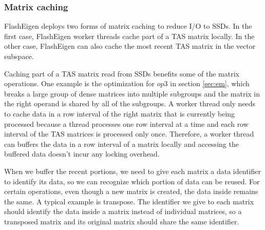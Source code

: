 

\subsubsection{Matrix caching}
FlashEigen deploys two forms of matrix caching to reduce I/O to SSDs.
In the first case, FlashEigen worker threads cache part of a TAS
matrix locally. In the other case, FlashEigen can also cache the most recent
TAS matrix in the vector subspace.

Caching part of a TAS matrix read from SSDs benefits some of
the matrix operations. One example is the optimization for $op3$ in section
\ref{sec:em}, which breaks a large group of dense matrices into multiple
subgroups and the matrix in the right operand is shared by all of the subgroups.
A worker thread only needs to cache data in a row interval of the right matrix
that is currently being processed because a thread processes one row interval
at a time and each row interval of the TAS matrices is processed only once.
Therefore, a worker thread can buffers the data in a row interval of a matrix
locally and accessing the buffered data doesn't incur any locking overhead.

When we buffer the recent portions, we need to give each matrix a data identifier
to identify its data, so we can recognize which portion of data can be reused.
For certain operations, even though a new matrix is created, the data inside
remains the same. A typical example is transpose. The identifier we give to
each matrix should identify the data inside a matrix instead of individual matrices,
so a transposed matrix and its original matrix should share the same identifier.

